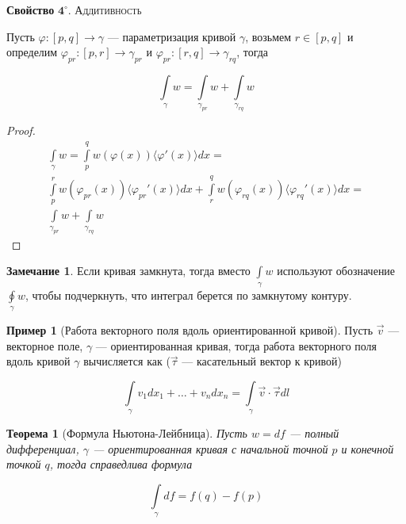 \documentclass[a5paper]{article}
\newcounter{through}
\theoremstyle{plain}
\newtheorem{theorem}[through]{Теорема}
\theoremstyle{definition}
\newtheorem{example}[through]{Пример}
\newtheorem{remark}[through]{Замечание}
\numberwithin{through}{section}
\numberwithin{equation}{section}
\begin{document}
	{\bf Свойство} $\mathbf{4^\circ.}$
	{\textsc{Аддитивность}}
	
	Пусть $\varphi : [p, q] \to \gamma$ --- параметризация кривой $\gamma$, возьмем $r \in [p, q]$ и определим $\varphi_{pr} : [p, r] \to \gamma_{pr}$ и $\varphi_{pr} : [r, q] \to \gamma_{rq}$, тогда
	
	\begin{equation*}
		\int\limits_{\gamma} w = \int\limits_{\gamma_{pr}} w + \int\limits_{\gamma_{rq}} w
	\end{equation*}
	
	\begin{proof}
			\begin{eqnarray} \nonumber
				\int\limits_{\gamma} w = \int\limits_p^q w(\varphi(x))\langle \varphi'(x) \rangle dx = \\\nonumber
				\int\limits_p^r w(\varphi_{pr}(x))\langle \varphi_{pr}'(x) \rangle dx + \int\limits_r^q w(\varphi_{rq}(x))\langle \varphi_{rq}'(x) \rangle dx
				= \\\nonumber
				\int\limits_{\gamma_{pr}} w + \int\limits_{\gamma_{rq}} w
			\end{eqnarray}
	\end{proof}


\begin{remark}
	Если кривая замкнута, тогда вместо $\int\limits_{\gamma} w$ используют обозначение $\oint\limits_{\gamma} w$, чтобы подчеркнуть, что интеграл берется по замкнутому контуру.
\end{remark}

\begin{example}[Работа векторного поля вдоль ориентированной кривой]
	Пусть $\vec{v}$ --- векторное поле, $\gamma$ --- ориентированная кривая, тогда работа векторного поля вдоль кривой $\gamma$ вычисляется как ($\vec{\tau}$ --- касательный вектор к кривой)
	
	\begin{equation*}
		\int\limits_{\gamma} v_1 dx_1 + \ldots + v_n dx_n = \int\limits_{\gamma} \vec{v} \cdot \vec{\tau} dl
	\end{equation*}
\end{example}

\begin{theorem}[Формула Ньютона-Лейбница]
	\label{NewtonLeibniz}
	Пусть $w=df$ --- полный дифференциал, $\gamma$ --- ориентированная кривая с начальной точной $p$ и конечной точкой $q$, тогда справедлива формула
	
	\begin{equation*}
		\int\limits_{\gamma} df = f(q) - f(p)
	\end{equation*}
\end{theorem}
\end{document}
